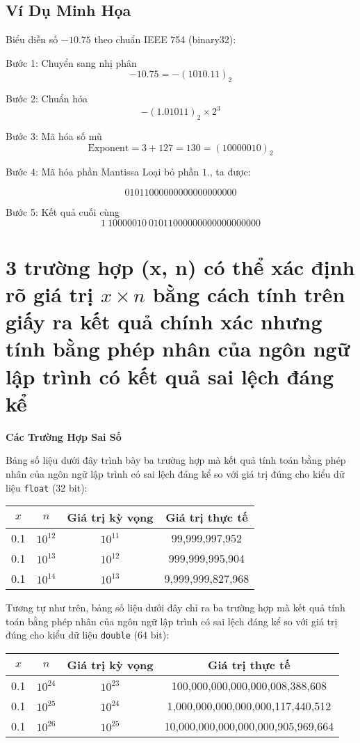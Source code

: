 \subsection{Ví Dụ Minh Họa}
Biểu diễn số \(-10.75\) theo chuẩn IEEE 754 (binary32):

Bước 1: Chuyển sang nhị phân
\[
-10.75 = -(1010.11)_2
\]

Bước 2: Chuẩn hóa
\[
- (1.01011)_2 \times 2^3
\]

Bước 3: Mã hóa số mũ
\[
\text{Exponent} = 3 + 127 = 130 = (10000010)_2
\]

Bước 4: Mã hóa phần Mantissa
Loại bỏ phần \(1.\), ta được:

\[
01011000000000000000000
\]

Bước 5: Kết quả cuối cùng
\[
1\ 10000010\ 01011000000000000000000
\]


\section{3 trường hợp (x, n) có thể xác định rõ giá trị $x \times n$ bằng cách tính trên giấy ra kết quả chính xác nhưng tính bằng phép nhân của ngôn ngữ lập trình có kết quả sai lệch đáng kể}

\textbf{Các Trường Hợp Sai Số}

Bảng số liệu dưới đây trình bày ba trường hợp mà kết quả tính toán bằng phép nhân của ngôn ngữ lập trình có sai lệch đáng kể so với giá trị đúng cho kiểu dữ liệu \texttt{float} (32 bit):

\begin{center}
\begin{tabular}{|c|c|c|c|}
\hline
$x$ & $n$ & Giá trị kỳ vọng & Giá trị thực tế \\
\hline
0.1 & $10^{12}$ & $10^{11}$ & 99,999,997,952 \\
0.1 & $10^{13}$ & $10^{12}$ & 999,999,995,904 \\
0.1 & $10^{14}$ & $10^{13}$ & 9,999,999,827,968 \\
\hline
\end{tabular}
\end{center}


Tương tự như trên, bảng số liệu dưới đây chỉ ra ba trường hợp mà kết quả tính toán bằng phép nhân của ngôn ngữ lập trình có sai lệch đáng kể so với giá trị đúng cho kiểu dữ liệu \texttt{double} (64 bit):

\begin{center}
\begin{tabular}{|c|c|c|c|}
\hline
$x$ & $n$ & Giá trị kỳ vọng & Giá trị thực tế \\
\hline
0.1 & $10^{24}$ & $10^{23}$ & 100,000,000,000,000,008,388,608 \\
0.1 & $10^{25}$ & $10^{24}$ & 1,000,000,000,000,000,117,440,512 \\
0.1 & $10^{26}$ & $10^{25}$ & 10,000,000,000,000,000,905,969,664 \\
\hline
\end{tabular}
\end{center}

